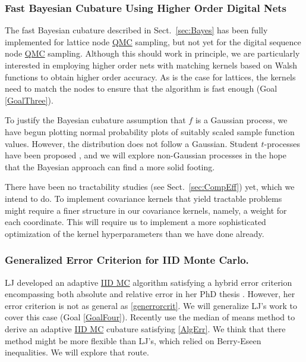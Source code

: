 \documentclass[11pt]{NSFamsart}
\newcommand{\QMC}{\hyperlink{QMClink}{QMC}\xspace}
\newcommand{\IIDMC}{\hyperlink{IIDMClink}{IID MC}\xspace}
\begin{document}
\subsubsection{Fast Bayesian Cubature Using Higher Order Digital Nets}  \label{sec:NewBayes}

The fast Bayesian cubature  described in Sect.\ \ref{sec:Bayes} \cite{RatHic19a} has been fully implemented for lattice node \QMC sampling, but not yet for the digital sequence node \QMC sampling.  Although this should work in principle, we are particularly interested in employing higher order nets with matching kernels based on Walsh functions to obtain higher order accuracy.  As is the case for lattices, the kernels need to match the nodes to ensure that the algorithm is fast enough (Goal \ref{GoalThree}).

To justify the Bayesian cubature assumption that $f$ is a Gaussian process, we have begun plotting normal probability plots of suitably scaled sample function values.  However, the distribution does not follow a Gaussian.  Student $t$-processes have been proposed \cite{ShaWilGha14a}, and we will explore non-Gaussian processes in the hope that the Bayesian approach can find a more solid footing.

There have been no tractability studies (see Sect.\ \ref{sec:CompEff}) yet, which we intend to do. To implement covariance kernels that yield tractable problems might require a finer structure in our covariance kernels, namely, a weight for each coordinate.  This will require us to implement a more  sophisticated optimization of the kernel hyperparameters than we have done already.

\subsubsection{Generalized Error Criterion for IID Monte Carlo.}  LJ developed an adaptive \IIDMC algorithm satisfying a hybrid error criterion encompassing both absolute and relative error in her PhD thesis \cite{Jia16a}.  However, her error criterion is not as general as \eqref{generrorcrit}.  We will generalize LJ's work to 
cover this case (Goal \ref{GoalFour}).  Recently \cite{KunEtal19a} use the median of means method to derive an adaptive \IIDMC cubature satisfying \eqref{AlgErr}.  We think that there method might be more flexible than  LJ's, which relied on Berry-Eseen inequalities.  We will explore that route.
\end{document}
